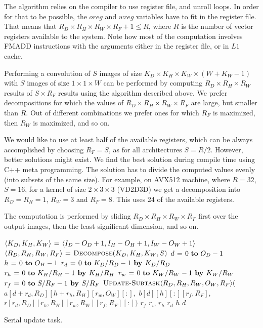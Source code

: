   The algorithm relies on the compiler to use register file, and
  unroll loops.  In order for that to be possible, the $oreg$ and
  $wreg$ variables have to fit in the register file.  That means that
  $R_D \times R_H \times R_W \times R_F + 1 \le R$, where $R$ is the
  number of vector registers available to the system.  Note how most
  of the computation involves FMADD instructions with the arguments
  either in the register file, or in $L1$ cache.

  Performing a convolution of $S$ images of size $K_D \times K_H
  \times K_W \times (W+K_W-1)$ with $S$ images of size $1 \times 1
  \times W$ can be performed by computing $R_D \times R_H \times R_W$
  results of $S \times R_F$ results using the algorithm described
  above.  We prefer decompositions for which the values of $R_D \times
  R_H \times R_W \times R_F$ are large, but smaller than $R$.  Out of
  different combinations we prefer ones for which $R_F$ is maximized,
  then $R_W$ is maximized, and so on.

  We would like to use at least half of the available registers, which
  can be always accomplished by choosing $R_F = S$, as for all
  architectures $S = R/2$.  However, better solutions might exist.  We
  find the best solution during compile time using C++ meta
  programming.  The solution has to divide the computed values evenly
  (into subsets of the same size).  For example, on AVX512 machine,
  where $R=32$, $S=16$, for a kernel of size $2 \times 3 \times 3$
  (VD2D3D) we get a decomposition into $R_D=R_H=1$, $R_W=3$ and
  $R_F=8$.  This uses 24 of the available registers.

  The computation is performed by sliding $R_D \times R_H \times R_W
  \times R_F$ first over the output images, then the least significant
  dimension, and so on.

  \begin{algorithm}
    {\footnotesize
      \begin{codebox}
        \li $\langle K_D,K_H,K_W\rangle \mathrel{\hspace{1pt}=\hspace{1pt}} \langle I_D-O_D+1,I_H-O_H+1,I_W-O_W+1\rangle$
        \li $\langle R_D,R_H,R_W,R_F\rangle \mathrel{\hspace{1pt}=\hspace{1pt}} \textnormal{\scshape Decompose}(K_D,K_H,K_W,S)$
        \li \For $d \gets 0 \To O_D-1$
        \li   \Do \For $h \gets 0 \To O_H-1$
        \li     \Do \For $r_d \gets 0 \To K_D/R_D-1 \kw{ by } K_D/R_D$
        \li       \Do \For $r_h \gets 0 \To K_H/R_H-1 \kw{ by } K_H/R_H$
        \li          \Do \For $r_w \gets 0 \To K_W/R_W-1 \kw{ by } K_W/R_W$
        \li            \Do \For $r_f \gets 0 \To S/R_F-1 \kw{ by } S/R_F$
        \li \Do $\textnormal{\scshape Update-Subtask}\langle R_D,R_H,R_W,O_W,R_F\rangle ($
        \li \Do $a[d+r_d,R_D][h+r_h,R_H][r_w,O_W][:],$
        \li     $b[d][h][:][r_f,R_F],$
        \li     $r[r_d,R_D][r_h,R_H][r_w,R_W][r_f,R_F][:])$
        \End
        \End \li {} $r_f$
        \End \li {} $r_w$
        \End \li {} $r_h$
        \End \li {} $r_d$
        \End \li {} $h$
        \End \li {} $d$

      \end{codebox}
    \caption{Serial update task.}
    \label{alg:serial-update-task}
    }
  \end{algorithm}

